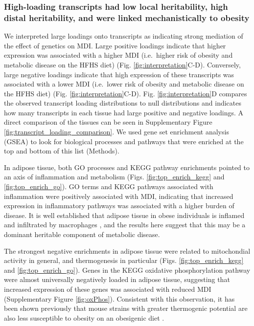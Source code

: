 \documentclass[
]{article}
\begin{document}
\pagebreak

\subsubsection{High-loading transcripts had low local heritability, high
distal heritability, and were linked mechanistically to
obesity}\label{high-loading-transcripts-had-low-local-heritability-high-distal-heritability-and-were-linked-mechanistically-to-obesity}

We interpreted large loadings onto transcripts as indicating strong
mediation of the effect of genetics on MDI. Large positive loadings
indicate that higher expression was associated with a higher MDI
(i.e.~higher risk of obesity and metabolic disease on the HFHS diet)
(Fig. \ref{fig:interpretation}C-D). Conversely, large negative loadings
indicate that high expression of these transcripts was associated with a
lower MDI (i.e.~lower risk of obesity and metabolic disease on the HFHS
diet) (Fig. \ref{fig:interpretation}C-D). Fig. \ref{fig:interpretation}D
compares the observed transcript loading distributions to null
distributions and indicates how many transcripts in each tissue had
large positive and negative loadings. A direct comparison of the tissues
can be seen in Supplementary Figure
\ref{fig:transcript_loading_comparison}. We used gene set enrichment
analysis (GSEA) \cite{fgsea, 
pmid16199517} to look for biological processes and pathways that were
enriched at the top and bottom of this list (Methods).

In adipose tissue, both GO processes and KEGG pathway enrichments
pointed to an axis of inflammation and metabolism (Figs.
\ref{fig:top_enrich_kegg} and \ref{fig:top_enrich_go}). GO terms and
KEGG pathways associated with inflammation were positively associated
with MDI, indicating that increased expression in inflammatory pathways
was associated with a higher burden of disease. It is well established
that adipose tissue in obese individuals is inflamed and infiltrated by
macrophages \cite{pmid19133410, 
pmid28955384, pmid28912810, pmid28901330, pmid24969772}, and the results
here suggest that this may be a dominant heritable component of
metabolic disease.

The strongest negative enrichments in adipose tissue were related to
mitochondial activity in general, and thermogenesis in particular (Figs.
\ref{fig:top_enrich_kegg} and \ref{fig:top_enrich_go}). Genes in the
KEGG oxidative phosphorylation pathway were almost universally
negatively loaded in adipose tissue, suggesting that increased
expression of these genes was associated with reduced MDI (Supplementary
Figure \ref{fig:oxPhos}). Consistent with this observation, it has been
shown previously that mouse strains with greater thermogenic potential
are also less susceptible to obesity on an obesigenic diet
\cite{pmid18492779}.
\end{document}
